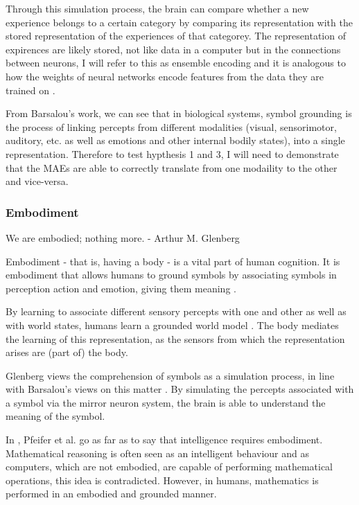 Through this simulation process, the brain can compare whether a new experience belongs to a certain category by comparing its representation with the stored representation of the experiences of that categorey. The representation of expirences are likely stored, not like data in a computer but in the connections between neurons, I will refer to this as ensemble encoding \cite{nicolelis1995sensorimotor} and it is analogous to how the weights of neural networks encode features from the data they are trained on \cite{mordvintsev2015inceptionism}.


From Barsalou's work, we can see that in biological systems, symbol grounding is the process of linking percepts from different modalities (visual, sensorimotor, auditory, etc. as well as emotions and other internal bodily states), into a single representation. Therefore to test hypthesis 1 and 3, I will need to demonstrate that the \acp{MAE} are able to correctly translate from one modaility to the other and vice-versa.

\subsubsection{Embodiment}
\label{sec:embodi}
\begin{displayquote}
We are embodied; nothing more. - Arthur M. Glenberg
\end{displayquote}
Embodiment - that is, having a body - is a vital part of human cognition. It is embodiment that allows humans to ground symbols by associating symbols in perception action and emotion, giving them meaning \cite{glenberg2015few}.

By learning to associate different sensory percepts with one and other as well as with world states, humans learn a grounded world model \cite{barsalou2008grounded}. The body mediates the learning of this representation, as the sensors from which the representation arises are (part of) the body. 

Glenberg \cite{glenberg2015few} views the comprehension of symbols as a simulation process, in line with Barsalou's views on this matter \cite{barsalou2008grounded}. By simulating the percepts associated with a symbol via the mirror neuron system, the brain is able to understand the meaning of the symbol.


In \cite{pfeifer2006body}, Pfeifer et al. go as far as to say that intelligence requires embodiment. Mathematical reasoning is often seen as an intelligent behaviour and as computers, which are not embodied, are capable of performing mathematical operations, this idea is contradicted. However, in humans, mathematics is performed in an embodied and grounded manner.  

